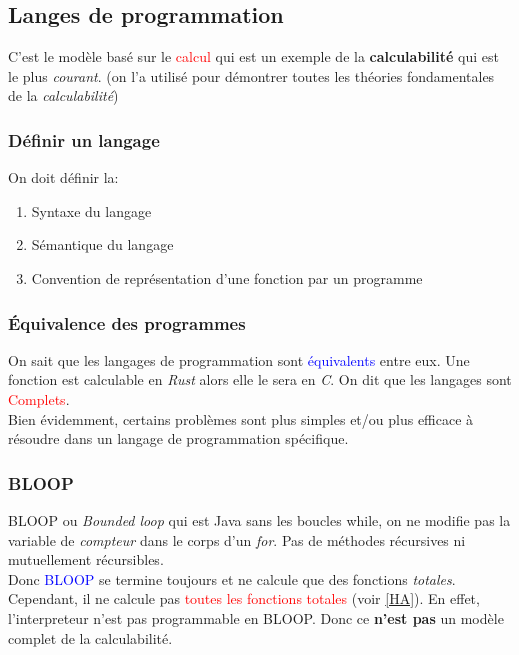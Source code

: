 \documentclass{report}
\begin{document}
\subsection{Langes de programmation}
C'est le modèle basé sur le \textcolor{red}{calcul} qui est un exemple de la \textbf{calculabilité} qui est le plus \textit{courant}. (on l'a utilisé pour démontrer toutes les théories fondamentales de la \textit{calculabilité})

\subsubsection{Définir un langage}
\noindent
On doit définir la:
\begin{enumerate}
\item Syntaxe du langage
\item Sémantique du langage
\item Convention de représentation d'une fonction par un programme
\end{enumerate}

\subsubsection{Équivalence des programmes}
On sait que les langages de programmation sont \textcolor{blue}{équivalents} entre eux.  Une fonction est calculable en \textit{Rust} alors elle le sera en \textit{C}. On dit que les langages sont \textcolor{red}{Complets}.\\
Bien évidemment, certains problèmes sont plus simples et/ou plus efficace à résoudre dans un langage de programmation spécifique.\\

\subsubsection{BLOOP}
BLOOP ou \textit{Bounded loop} qui est Java sans les boucles while, on ne modifie pas la variable de \textit{compteur} dans le corps d'un \textit{for}. Pas de méthodes récursives ni mutuellement récursibles.\\
Donc \textcolor{blue}{BLOOP} se termine toujours et ne calcule que des fonctions \textit{totales}. Cependant, il ne calcule pas \textcolor{red}{toutes les fonctions totales} (voir \ref{HA}). En effet, l'interpreteur n'est pas programmable en BLOOP. Donc ce \textbf{n'est pas} un modèle complet de la calculabilité.
\end{document}
